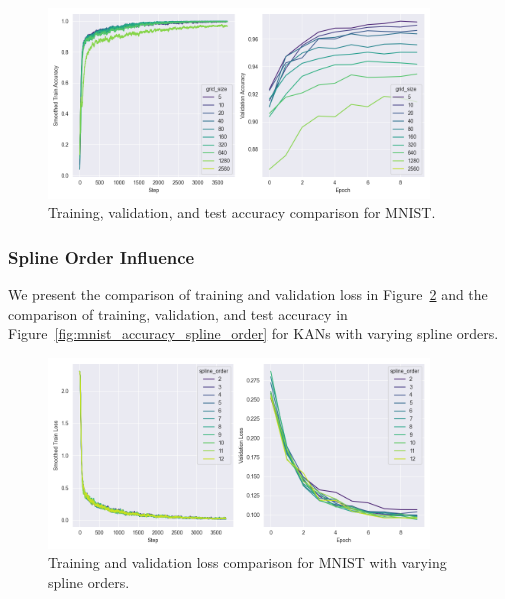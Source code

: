 \documentclass{article}
\begin{document}
\begin{figure}[H]
    \centering
    \includegraphics[width=0.9\textwidth]{pics/mnist_accuracy_grid_size}
    \caption{Training, validation, and test accuracy comparison for MNIST.}
    \label{fig:mnist_accuracy_grid_size}
\end{figure}


\subsubsection{Spline Order Influence}\label{subsubsec:spline-order-influence}

We present the comparison of training and validation loss in Figure~\ref{fig:mnist_loss_spline_order}
and the comparison of training, validation, and test accuracy in Figure~\ref{fig:mnist_accuracy_spline_order} for KANs with varying spline orders.

\begin{figure}[H]
    \centering
    \includegraphics[width=0.9\textwidth]{pics/mnist_loss_spline_order}
    \caption{Training and validation loss comparison for MNIST with varying spline orders.}
    \label{fig:mnist_loss_spline_order}
\end{figure}
\end{document}
